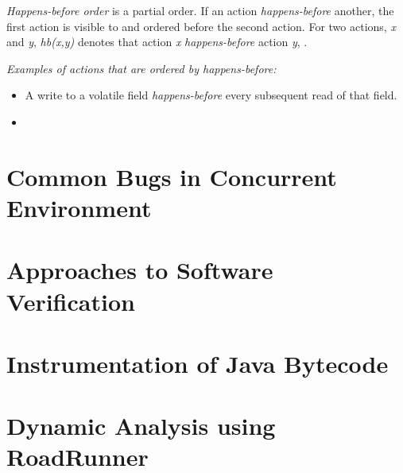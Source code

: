 \emph{Happens-before order} is a partial order. If an action
\emph{happens-before} another, the first action is visible to and ordered before
the second action. For two actions, \emph{x} and \emph{y}, \emph{hb(x,y)}
denotes that action \emph{x} \emph{happens-before} action \emph{y}, 
\todo{}.

\emph{Examples of actions that are ordered by happens-before:}
\begin{itemize}
    \item A write to a volatile field \emph{happens-before} every subsequent read
    of that field.
    \item \todo{}
\end{itemize}


\section{Common Bugs in Concurrent Environment}



\section{Approaches to Software Verification}



\section{Instrumentation of Java Bytecode}



\section{Dynamic Analysis using RoadRunner}

\cite{RoadRunner}




